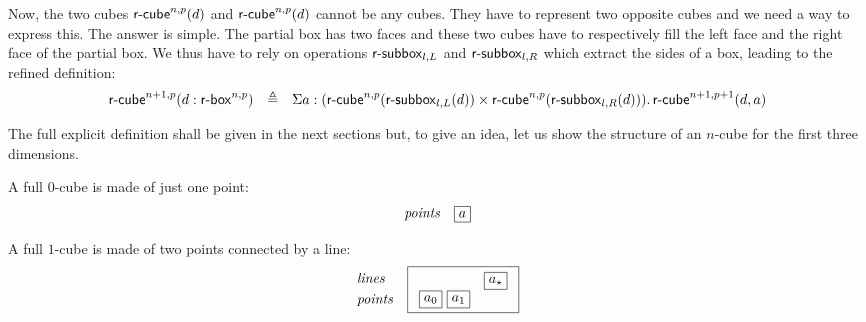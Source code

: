 \documentclass{article}
\newcommand{\defeq}{\triangleq}
\begin{document}
Now, the two cubes $\mathsf{r\mbox{-}cube}_{}^{n,p}(d)$ and $\mathsf{r\mbox{-}cube}_{}^{n,p}(d)$ cannot be
any cubes. They have to represent two opposite cubes and we need a way
to express this. The answer is simple. The partial box has two faces
and these two cubes have to respectively fill the left face and the
right face of the partial box. We thus have to rely on operations
$\mathsf{r\mbox{-}subbox}_{l,L}$ and $\mathsf{r\mbox{-}subbox}_{l,R}$ which extract the sides of a box,
leading to the refined definition:
$$
\begin{array}{lll}
\mycube{}^{n+1,p}(d:\mybox{}^{n,p}) &\defeq& \Sigma a:(\mycube{}^{n,p}(\downbox{l}{L}(d)) \times \mycube{}^{n,p}(\downbox{l}{R}(d))).\,\mycube{}^{n+1,p+1}(d,a)
\end{array}
$$

The full explicit definition shall be given in the next sections but,
to give an idea, let us show the structure of an $n$-cube for the
first three dimensions.


A full $0$-cube is made of just one point:
$$
\begin{array}{lll}
\mbox{\textit{points}}\\
\end{array}
\begin{array}{lll}
  \framebox{$a$}\\
\end{array}
$$

A full $1$-cube is made of two points connected by a line:
$$
\begin{array}{lll}
\mbox{\textit{lines}}\\
[1mm]\mbox{\textit{points}}\\
\end{array}
\begin{array}{lll}
\framebox{$
\begin{array}{ll}
  & \framebox{$a_{\star}$}\\
\framebox{$a_0$}~\framebox{$a_1$}\\
\end{array}
$}
\end{array}
$$
\end{document}
